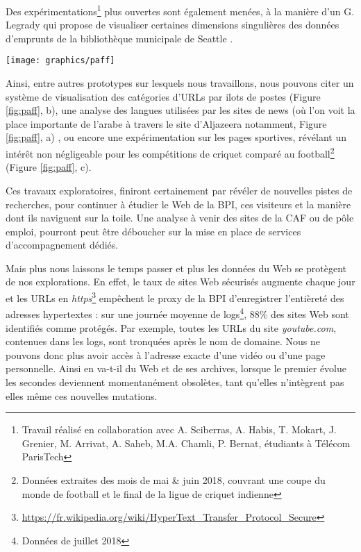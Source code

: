 \documentclass[symmetric,justified,marginals=raggedouter]{tufte-book}
\begin{document}
Des expérimentations\footnote{Travail réalisé en collaboration avec A. Sciberras, A. Habis, T. Mokart, J. Grenier, M. Arrivat, A. Saheb, M.A. Chamli, P. Bernat, étudiants à Télécom ParisTech} plus ouvertes sont également menées, à la manière d'un G. Legrady qui propose de visualiser certaines dimensions singulières des données d'emprunts de la bibliothèque municipale de Seattle \citep{legrady_making_2005}.

\begin{figure*}
  \texttt{[image: graphics/paff]}
  \caption{Prototypes de systèmes de visualisations, basés sur des dimensions particulières des logs de la BPI}
  \label{fig:paff}
\end{figure*}

\noindent Ainsi, entre autres prototypes sur lesquels nous travaillons, nous pouvons citer un système de visualisation des catégories d'URLs par ilots de postes (Figure \ref{fig:paff}, b), une analyse des langues utilisées par les sites de news (où l'on voit la place importante de l'arabe à travers le site d'Aljazeera notamment, Figure \ref{fig:paff}, a) , ou encore une expérimentation sur les pages sportives, révélant un intérêt non négligeable pour les compétitions de criquet comparé au football\footnote{Données extraites des mois de mai \& juin 2018, couvrant une coupe du monde de football et le final de la ligue de criquet indienne} (Figure \ref{fig:paff}, c).

Ces travaux exploratoires, finiront certainement par révéler de nouvelles pistes de recherches, pour continuer à étudier le Web de la BPI, ces visiteurs et la manière dont ils naviguent sur la toile. Une analyse à venir des sites de la CAF ou de pôle emploi, pourront peut être déboucher sur la mise en place de services d'accompagnement dédiés. 

Mais plus nous laissons le temps passer et plus les données du Web se protègent de nos explorations. En effet, le taux de sites Web sécurisés augmente chaque jour et les URLs en \textit{https}\footnote{\url{https://fr.wikipedia.org/wiki/HyperText\_Transfer\_Protocol\_Secure}} empêchent le proxy de la BPI d'enregistrer l'entièreté des adresses hypertextes : sur une journée moyenne de logs\footnote{Données de juillet 2018}, $88\%$ des sites Web sont identifiés comme protégés. Par exemple, toutes les URLs du site \textit{youtube.com}, contenues dans les logs, sont tronquées après le nom de domaine. Nous ne pouvons donc plus avoir accès à l'adresse exacte d'une vidéo ou d'une page personnelle. Ainsi en va-t-il du Web et de ses archives, lorsque le premier évolue les secondes deviennent momentanément obsolètes, tant qu'elles n'intègrent pas elles même ces nouvelles mutations. 
\end{document}
